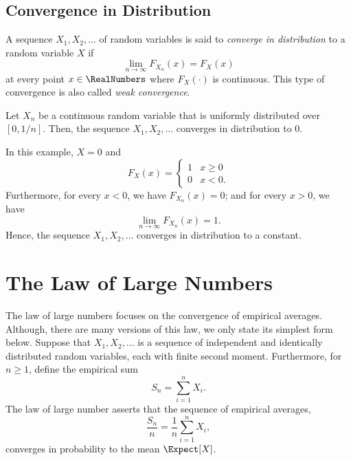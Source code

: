 \subsection{Convergence in Distribution}

A sequence $X_1, X_2, \ldots$ of random variables is said to \emph{converge in distribution} to a random variable $X$ if 
\begin{equation*}
\lim_{n \rightarrow \infty} F_{X_n} (x) = F_X (x)
\end{equation*}
at every point $x \in \RealNumbers$ where $F_X (\cdot)$ is continuous.
This type of convergence is also called \emph{weak convergence}.  

\begin{example}
Let $X_n$ be a continuous random variable that is uniformly distributed over $[0, 1/n]$.
Then, the sequence $X_1, X_2, \ldots$ converges in distribution to $0$.

In this example, $X = 0$ and
\begin{equation*}
F_X (x) = \begin{cases} 1 & x \geq 0 \\
0 & x < 0. \end{cases}
\end{equation*}
Furthermore, for every $x < 0$, we have $F_{X_n} (x) = 0$; and for every $x > 0$, we have
\begin{equation*}
\lim_{n \rightarrow \infty} F_{X_n} (x) = 1.
\end{equation*}
Hence, the sequence $X_1, X_2, \ldots$ converges in distribution to a constant.
\end{example}


\section{The Law of Large Numbers}

The law of large numbers focuses on the convergence of empirical averages.
Although, there are many versions of this law, we only state its simplest form below.
Suppose that $X_1, X_2, \ldots$ is a sequence of independent and identically distributed random variables, each with finite second moment.
Furthermore, for $n \geq 1$, define the empirical sum
\begin{equation*}
S_n = \sum_{i=1}^n X_i .
\end{equation*}
The law of large number asserts that the sequence of empirical averages,
\begin{equation*}
\frac{S_n}{n} = \frac{1}{n} \sum_{i=1}^n X_i ,
\end{equation*}
converges in probability to the mean $\Expect [X]$.

